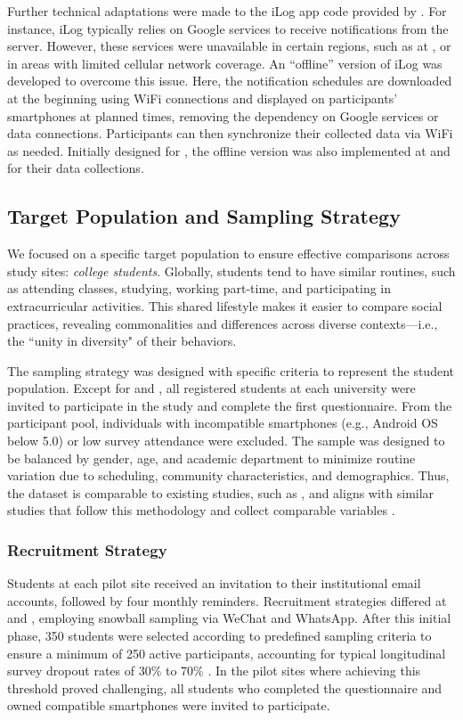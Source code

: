 Further technical adaptations were made to the iLog app code provided by \cite{2020-zeni1}. For instance, iLog typically relies on Google services to receive notifications from the server. However, these services were unavailable in certain regions, such as at \JLU, or in areas with limited cellular network coverage. An ``offline'' version of iLog was developed to overcome this issue. Here, the notification schedules are downloaded at the beginning using WiFi connections and displayed on participants’ smartphones at planned times, removing the dependency on Google services or data connections. Participants can then synchronize their collected data via WiFi as needed. Initially designed for \JLU, the offline version was also implemented at \AMRITA and \IPICYT for their data collections.

\subsection{Target Population and Sampling Strategy} \label{subsec:sample}

We focused on a specific target population to ensure effective comparisons across study sites: \textit{college students}. Globally, students tend to have similar routines, such as attending classes, studying, working part-time, and participating in extracurricular activities. This shared lifestyle makes it easier to compare social practices, revealing commonalities and differences across diverse contexts—i.e., the ``unity in diversity" of their behaviors.

The sampling strategy was designed with specific criteria to represent the student population. Except for \JLU and \IPICYT, all registered students at each university were invited to participate in the study and complete the first questionnaire. From the participant pool, individuals with incompatible smartphones (e.g., Android OS below 5.0) or low survey attendance were excluded. The sample was designed to be balanced by gender, age, and academic department to minimize routine variation due to scheduling, community characteristics, and demographics. Thus, the dataset is comparable to existing studies, such as \cite{wang2014studentlife}, and aligns with similar studies that follow this methodology and collect comparable variables \cite{li2022representing, 2017-SOCINFO}.

\subsubsection{Recruitment Strategy}
Students at each pilot site received an invitation to their institutional email accounts, followed by four monthly reminders. Recruitment strategies differed at \JLU and \IPICYT, employing snowball sampling via WeChat and WhatsApp. After this initial phase, 350 students were selected according to predefined sampling criteria to ensure a minimum of 250 active participants, accounting for typical longitudinal survey dropout rates of 30\% to 70\% \cite{gustavson2012attrition}. In the pilot sites where achieving this threshold proved challenging, all students who completed the questionnaire and owned compatible smartphones were invited to participate.

